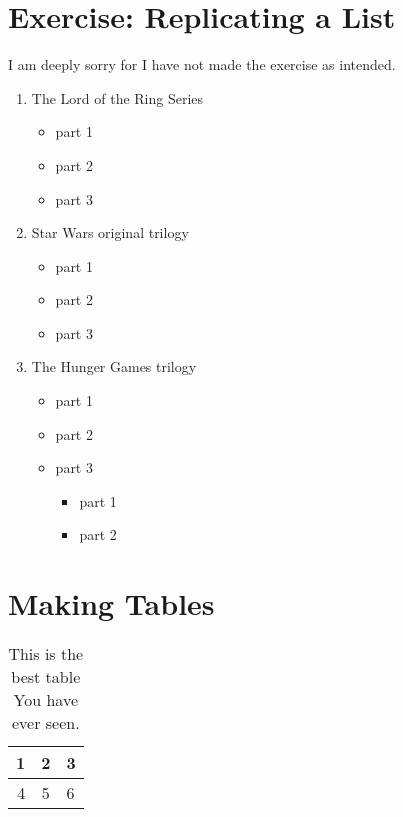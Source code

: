 \documentclass[12pt, titlepage]{article}
\begin{document}
\newpage
\section{Exercise: Replicating a List}
I am deeply sorry for I have not made the exercise as intended.
\begin{enumerate}
    \item The Lord of the Ring Series
    \begin{itemize}
        \item part 1
        \item part 2
        \item part 3
    \end{itemize}
    \item Star Wars original trilogy
    \begin{itemize}
        \item part 1
        \item part 2
        \item part 3
    \end{itemize}
    \item The Hunger Games trilogy
    \begin{itemize}
        \item part 1
        \item part 2
        \item part 3
        \begin{itemize}
            \item part 1
            \item part 2
        \end{itemize}
    \end{itemize}
\end{enumerate}

\section{Making Tables}
\begin{table}[h] %
    \centering
    \begin{tabular}{| r | c | l |} %
        \hline 1 & 2 & 3 \\ \hline
        4 & 5 & 6 \\ \hline
    \end{tabular}
    \caption{This is the best table You have ever seen.}
\end{table}
\end{document}
